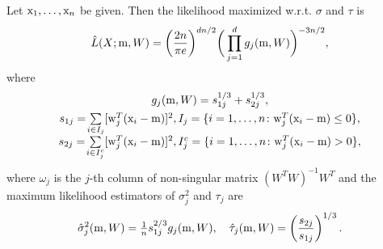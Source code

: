 \begin{theorem}\label{the:min}
Let $\mathrm{x}_1,\ldots,\mathrm{x}_n$ be given.  
Then the likelihood maximized w.r.t. $\sigma$ and $\tau$ is
\begin{equation}\label{eq:1}
 \hat{L}(X;\mathrm{m},W) =   \bigg( \frac{2n}{\pi e} \bigg)^{dn/2} \bigg( \prod_{j=1}^{d} g_{j}(\mathrm{m},W) \bigg)^{-3n/2},
\end{equation}
where
$$
\begin{array}{c}
{g}_{j}(\mathrm{m},W) = {s}_{1j}^{1/3} + {s}_{2j}^{1/3},
\\[1ex]
{s}_{1j}= \! \sum\limits_{i \in I_j}[ \mathrm{w}_{j}^T (\mathrm{x}_i-\mathrm{m})]^2,  {I}_j=\{ i = 1,\ldots,n \colon \mathrm{w}_{j}^T (\mathrm{x}_i-\mathrm{m}) \leq 0 \},
\\[1ex]
{s}_{2j}= \! \sum\limits_{i \in I_j^c}[ \mathrm{w}_{j}^T (\mathrm{x}_i-\mathrm{m})]^2, {I}_j^c=\{ i = 1,\ldots,n \colon  \mathrm{w}_{j}^T (\mathrm{x}_i-\mathrm{m}) > 0 \},
\end{array}
$$
where $\omega_j$ is the $j$-th column of non-singular matrix $(W^TW)^{-1}W^T$ and the maximum likelihood estimators of $\sigma_{j}^2$ and $\tau_{j}$ are
$$\hat \sigma_j^2(\mathrm{m},W) = \tfrac{1}{n} s_{1j}^{2/3} g_{j}(\mathrm{m},W), \quad
\hat \tau_{j}(\mathrm{m},W)=\left(\frac{s_{2j}}{s_{1j}}\right)^{1/3}.
$$
\end{theorem}

